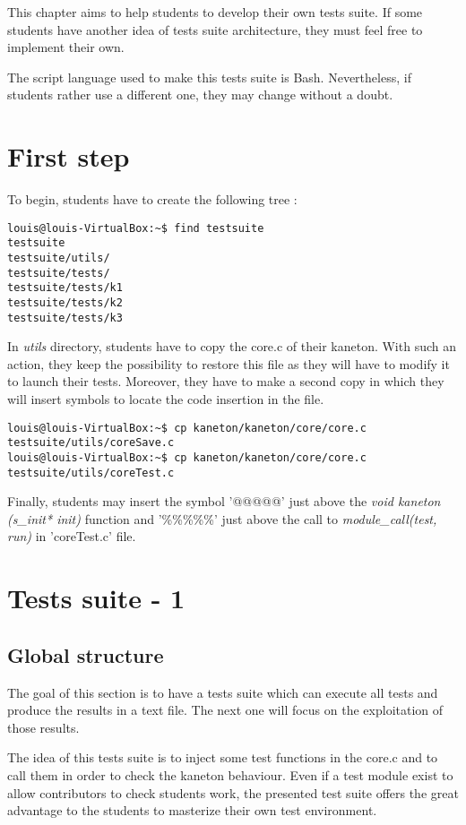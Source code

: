 This chapter aims to help students to develop their own tests suite. If some students have another idea of tests suite architecture, they must feel free to implement their own.

The script language used to make this tests suite is Bash. Nevertheless, if students rather use a different one, they may change without a doubt.

\section{First step}
To begin, students have to create the following tree :
\begin{verbatim}
louis@louis-VirtualBox:~$ find testsuite
testsuite
testsuite/utils/
testsuite/tests/
testsuite/tests/k1
testsuite/tests/k2
testsuite/tests/k3
\end{verbatim}

In \textit{utils} directory, students have to copy the core.c of their kaneton. With such an action, they keep the possibility to restore this file as they will have to modify it to launch their tests. Moreover, they have to make a second copy in which they will insert symbols to locate the code insertion in the file.

\begin{verbatim}
louis@louis-VirtualBox:~$ cp kaneton/kaneton/core/core.c testsuite/utils/coreSave.c
louis@louis-VirtualBox:~$ cp kaneton/kaneton/core/core.c testsuite/utils/coreTest.c
\end{verbatim}

Finally, students may insert the symbol '@@@@@' just above the \textit{void kaneton (s\_init* init)} function and '\%\%\%\%\%'  just above the call to \textit{module\_call(test, run)} in 'coreTest.c' file.

\section{Tests suite - 1}
\subsection{Global structure}
The goal of this section is to have a tests suite which can execute all tests and produce the results in a text file. The next one will focus on the exploitation of those results.

The idea of this tests suite is to inject some test functions in the core.c and to call them in order to check the kaneton behaviour. Even if a test module exist to allow contributors to check students work, the presented test suite offers the great advantage to the students to masterize their own test environment.

